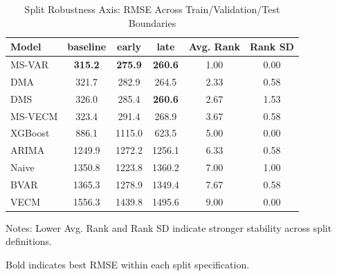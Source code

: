 \begin{table}[htbp]
\centering
\small
\caption{Split Robustness Axis: RMSE Across Train/Validation/Test Boundaries}
\label{tab:split_robustness}
\begin{tabular}{lccccc}
\toprule
Model & baseline & early & late & Avg. Rank & Rank SD \\
\midrule
MS-VAR & \textbf{315.2} & \textbf{275.9} & \textbf{260.6} & 1.00 & 0.00 \\
DMA & 321.7 & 282.9 & 264.5 & 2.33 & 0.58 \\
DMS & 326.0 & 285.4 & \textbf{260.6} & 2.67 & 1.53 \\
MS-VECM & 323.4 & 291.4 & 268.9 & 3.67 & 0.58 \\
XGBoost & 886.1 & 1115.0 & 623.5 & 5.00 & 0.00 \\
ARIMA & 1249.9 & 1272.2 & 1256.1 & 6.33 & 0.58 \\
Naive & 1350.8 & 1223.8 & 1360.2 & 7.00 & 1.00 \\
BVAR & 1365.3 & 1278.9 & 1349.4 & 7.67 & 0.58 \\
VECM & 1556.3 & 1439.8 & 1495.6 & 9.00 & 0.00 \\
\bottomrule
\end{tabular}
\begin{tablenotes}
\small
\item Notes: Lower Avg. Rank and Rank SD indicate stronger stability across split definitions.
\item Bold indicates best RMSE within each split specification.
\end{tablenotes}
\end{table}